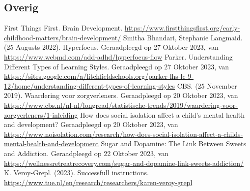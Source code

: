 \documentclass{article}
\begin{document}
\begin{thebibliography}{9}
        \item\subsection*{Overig}
                First Things First. Brain Development. \url{https://www.firstthingsfirst.org/early-childhood-matters/brain-development/}
                Smitha Bhandari, Stephanie Langmaid. (25 Augusts 2022). Hyperfocus. Geraadpleegd op 27 Oktober 2023, van \url{https://www.webmd.com/add-adhd/hyperfocus-flow}
                Parker. Understanding Different Types of Learning Styles. Geraadpleegd op 27 Oktober 2023, van \url{https://sites.google.com/a/litchfieldschools.org/parker-lhs-lc-9-12/home/understanding-different-types-of-learning-styles}
                CBS. (25 November 2019). Waardering voor zorgverleners. Geraadpleegd op 20 Oktober 2023, van \url{https://www.cbs.nl/nl-nl/longread/statistische-trends/2019/waardering-voor-zorgverleners/1-inleiding}
                How does social isolation affect a child’s mental health and development? Geraadpleegd op 20 Oktober 2023, van \url{https://www.noisolation.com/research/how-does-social-isolation-affect-a-childs-mental-health-and-development}
                Sugar and Dopamine: The Link Between Sweets and Addiction. Geraadpleegd op 22 Oktober 2023, van \url{https://wellnessretreatrecovery.com/sugar-and-dopamine-link-sweets-addiction/}
                K. Veroy-Grepl. (2023). Successfull instructions. \url{https://www.tue.nl/en/research/researchers/karen-veroy-grepl}

    \end{thebibliography}

\end{document}
